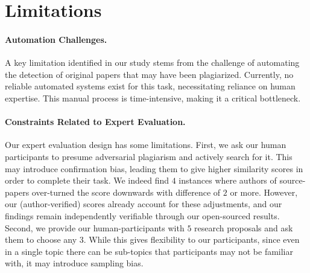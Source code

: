 \section{Limitations} 
\label{sec:limitations}

\paragraph{Automation Challenges.}
A key limitation identified in our study stems 
from the challenge of automating the 
detection of original papers that may have been plagiarized. 
Currently, no reliable automated systems exist for this task, 
necessitating reliance on human expertise. 
This manual process is time-intensive, making it a critical bottleneck.


\paragraph{Constraints Related to Expert Evaluation.} \label{para:lim-expert-evaluation}
Our expert evaluation design has some limitations. 
First, we ask our human participants to presume adversarial plagiarism and actively search for it. 
This may introduce confirmation bias, 
leading them to give higher similarity scores in order to complete their task. 
We indeed find $4$ instances 
where 
authors of source-papers over-turned the score downwards 
with difference of $2$ or more. 
However, our (author-verified) scores already account for these adjustments, 
and our findings remain independently verifiable 
through our open-sourced results. 
Second, we provide our human-participants with $5$ research proposals and ask them to choose any $3$. 
While this gives flexibility to our participants, 
since even in a single topic there can be sub-topics that participants may not be familiar with, 
it may introduce sampling bias. 

